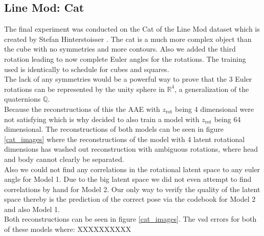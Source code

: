\documentclass[10pt,a4paper]{article}
\newcommand{\rot}{\ensuremath{\text{rot}\xspace}}
\begin{document}
\subsection{Line Mod: Cat}
The final experiment was conducted on the Cat of the Line Mod dataset which is created by Stefan Hinterstoisser \cite{LINEMOD}.
The cat is a much more complex object than the cube with no symmetries and more contours. Also we added the third rotation leading to now complete Euler angles for the rotations. The training used is identically to schedule for cubes and squares. \\
The lack of any symmetries would be a powerful way to prove that the 3 Euler rotations can be represented by the unity sphere in $\mathbb{R}^4$, a generalization of the quaternions $\mathbb{Q}$.\\
Because the reconstructions of this the AAE with $z_{\rot}$ being 4 dimensional were not satisfying which is why decided to also train a model with $z_{\rot}$ being 64 dimensional. The reconstructions of both models can be seen in figure \ref{cat_images} where the reconstructions of the model with 4 latent rotational dimensions has washed out reconstruction with ambiguous rotations, where head and body cannot clearly be separated. \\
Also we could not find any correlations in the rotational latent space to any euler angle for Model 1. Due to the big latent space we did not even attempt to find correlations by hand for Model 2. Our only way to verify the quality of the latent space thereby is the prediction of the correct pose via the codebook for Model 2 and also Model 1. \\




 Both reconstructions can be seen in figure \ref{cat_images}. The vsd errors for both of these models where: XXXXXXXXXX
\end{document}
